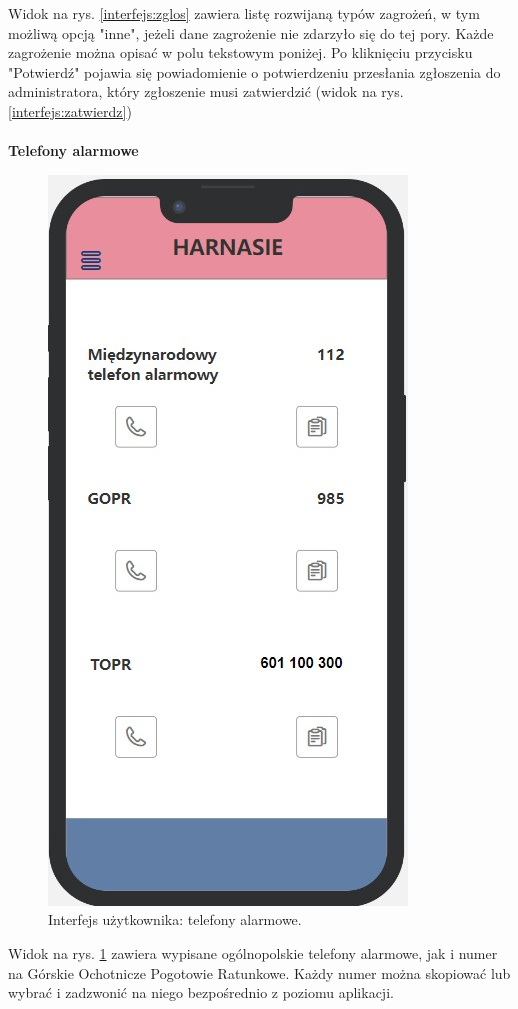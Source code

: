    Widok na rys. \ref{interfejs:zglos} zawiera listę rozwijaną typów zagrożeń, w tym możliwą opcją "inne", jeżeli dane zagrożenie nie zdarzyło się do tej pory. Każde zagrożenie można opisać w polu tekstowym poniżej. Po kliknięciu przycisku "Potwierdź" pojawia się powiadomienie o potwierdzeniu przesłania zgłoszenia do administratora, który zgłoszenie musi zatwierdzić (widok na rys. \ref{interfejs:zatwierdz}) \\
   \\
   \textbf{Telefony alarmowe}
    \begin{figure}[H]
        \centering
        \includegraphics[scale=0.5]{img/interfejsy/if_alarmm.jpg}
        \caption{Interfejs użytkownika: telefony alarmowe.}
        \label{interfejs:alarm}
    \end{figure}
   Widok na rys. \ref{interfejs:alarm} zawiera wypisane ogólnopolskie telefony alarmowe, jak i numer na Górskie Ochotnicze Pogotowie Ratunkowe. Każdy numer można skopiować lub wybrać i zadzwonić na niego bezpośrednio z poziomu aplikacji.

